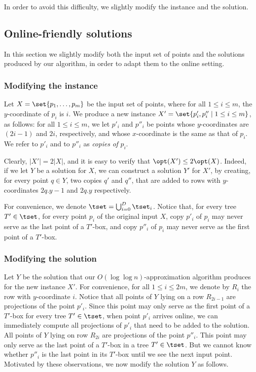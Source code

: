 In order to avoid this difficulty, we slightly modify the instance and the solution. 


%
%


\subsection{Online-friendly solutions}
\label{sec: online-friendly}

In this section we slightly modify both the input set of points and the solutions produced by our algorithm, in order to adapt them to the online setting.

\subsubsection{Modifying the instance}

Let $X=\set{p_1,\ldots,p_m}$ be the input set of points, where for all $1\leq i\leq m$, the $y$-coordinate of $p_i$ is $i$. We produce a new instance $X'=\set{p_i',p_i''\mid 1\leq i\leq m}$, as follows: for all $1\leq i\leq m$, we let $p'_i$ and $p''_i$ be points whose $y$-coordinates are $(2i-1)$ and $2i$, respectively, and whose $x$-coordinate is the same as that of $p_i$. We refer to $p'_i$ and to $p''_i$ as \emph{copies of $p_i$}.
	
	Clearly, $|X'|=2|X|$, and it is easy to verify that $\opt(X')\leq 2\opt(X)$. Indeed, if we let $Y$ be a solution for $X$, we can construct a solution $Y'$ for $X'$, by creating, for every point $q\in Y$, two copies $q'$ and $q''$, that are added to rows with $y$-coordinates $2q.y-1$ and $2q.y$ respectively.

For convenience, we denote $\tset=\bigcup_{i=0}^D\tset_i$. Notice that, for every tree $T'\in \tset$, for every point $p_i$ of the original input $X$, copy $p'_i$ of $p_i$ may never serve as the last point of a $T'$-box, and copy $p''_i$ of $p_i$ may never serve as the first point of a $T'$-box.
	
	
\subsubsection{Modifying the solution}


Let $Y$ be the solution that our $O(\log\log n)$-approximation algorithm produces for the new instance $X'$. For convenience, for all $1\leq i\leq 2m$, we denote by $R_i$ the row with $y$-coordinate $i$. Notice that all points of $Y$ lying on a row $R_{2i-1}$ are projections of the point $p'_i$. Since this point may only serve as the first point of a $T'$-box for every tree $T'\in \tset$, when point $p'_i$ arrives online, we can immediately compute all projections of $p'_i$ that need to be added to the solution.
All points of $Y$ lying on row $R_{2i}$ are projections of the point $p''_i$. This point may only serve as the last point of a $T'$-box in a tree $T'\in \tset$. But we cannot know whether $p''_i$ is the last point in its $T'$-box until we see the next input point. Motivated by these observations, we now modify the solution $Y$ as follows.

